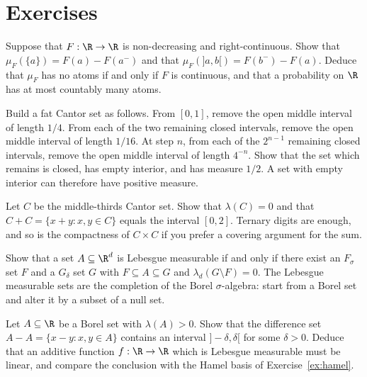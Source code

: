 \section{Exercises}

\begin{exercise}[$\star$]\label{ex:atoms}
Suppose that $F:\R\to\R$ is non-decreasing and right-continuous.
Show that $\mu_F(\{a\})=F(a)-F(a^-)$ and that $\mu_F(]a,b[)=F(b^-)-F(a)$.
Deduce that $\mu_F$ has no atoms if and only if $F$ is continuous, and that a probability on $\R$ has at most countably many atoms.
\end{exercise}

\begin{exercise}[$\star$]\label{ex:fatcantor}
Build a fat Cantor set as follows.
From $[0,1]$, remove the open middle interval of length $1/4$.
From each of the two remaining closed intervals, remove the open middle interval of length $1/16$.
At step $n$, from each of the $2^{n-1}$ remaining closed intervals, remove the open middle interval of length $4^{-n}$.
Show that the set which remains is closed, has empty interior, and has measure $1/2$.
A set with empty interior can therefore have positive measure.
\end{exercise}

\begin{exercise}[$\star\star$]\label{ex:cantorsum}
Let $C$ be the middle-thirds Cantor set.
Show that $\lambda(C)=0$ and that $C+C=\{x+y:x,y\in C\}$ equals the interval $[0,2]$.
Ternary digits are enough, and so is the compactness of $C\times C$ if you prefer a covering argument for the sum.
\end{exercise}

\begin{exercise}[$\star\star$]\label{ex:completion}
Show that a set $A\subseteq\R^d$ is Lebesgue measurable if and only if there exist an $F_\sigma$ set $F$ and a $G_\delta$ set $G$ with $F\subseteq A\subseteq G$ and $\lambda_d(G\setminus F)=0$.
The Lebesgue measurable sets are the completion of the Borel $\sigma$-algebra: start from a Borel set and alter it by a subset of a null set.
\end{exercise}

\begin{exercise}[$\star\star$]\label{ex:steinhaus}
Let $A\subseteq\R$ be a Borel set with $\lambda(A)>0$.
Show that the difference set $A-A=\{x-y:x,y\in A\}$ contains an interval $]-\delta,\delta[$ for some $\delta>0$.
Deduce that an additive function $f:\R\to\R$ which is Lebesgue measurable must be linear, and compare the conclusion with the Hamel basis of Exercise~\ref{ex:hamel}.
\end{exercise}

